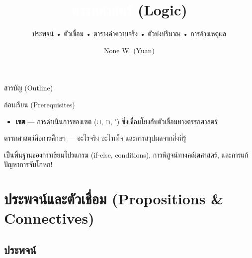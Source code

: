 \documentclass[11pt, aspectratio=169]{beamer}
\title[ตรรกศาสตร์]{\textcolor{white}{ตรรกศาสตร์} \textcolor{boxBlue!60}{(Logic)}}
\subtitle{ประพจน์ • ตัวเชื่อม • ตารางค่าความจริง • ตัวบ่งปริมาณ • การอ้างเหตุผล }
\author[None W. (Yuan)]{None W. (Yuan)}
\date{}
\begin{document}
\begin{frame}[plain]
  \titlepage
\end{frame}

\begin{frame}{สารบัญ (Outline)}
  \tableofcontents
\end{frame}

\begin{frame}{ก่อนเรียน (Prerequisites)}
  \begin{explanation}
    \begin{itemize}
      \item \textbf{เซต} — การดำเนินการของเซต ($\cup$, $\cap$, $'$) ซึ่งเชื่อมโยงกับตัวเชื่อมทางตรรกศาสตร์
    \end{itemize}
  \end{explanation}

  \begin{intuition}
    ตรรกศาสตร์คือการศึกษา  — อะไรจริง อะไรเท็จ
    และการสรุปผลจากสิ่งที่รู้

    \medskip
    เป็นพื้นฐานของการเขียนโปรแกรม (if-else, conditions), การพิสูจน์ทางคณิตศาสตร์,
    และการแก้ปัญหาการจับโกหก!
  \end{intuition}
\end{frame}

\section{ประพจน์และตัวเชื่อม (Propositions \& Connectives)}

\subsection{ประพจน์}
\end{document}
